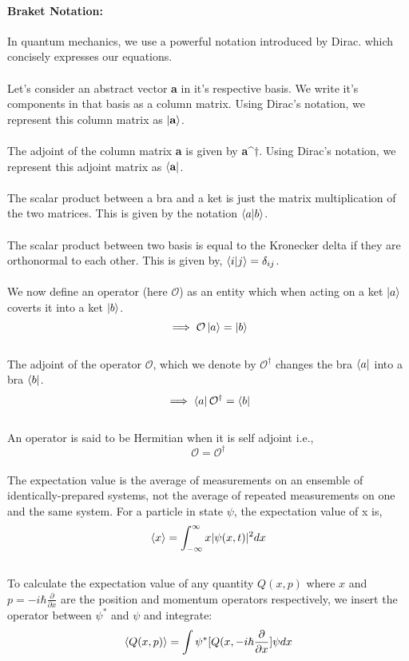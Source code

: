 \documentclass[12pt]{article}
\begin{document}
\paragraph{Braket Notation:}
In quantum mechanics, we use a powerful notation introduced by Dirac. which concisely expresses our equations. 
\\
\\
Let's consider an abstract vector \textbf{a} in it's respective basis. We write it's components in that basis as a 
column matrix. Using Dirac's notation, we represent this column matrix as $\ket{\textbf{a}}$.
\\
\\
The adjoint of the column matrix \textbf{a} is given by \textbf{a^$\dagger$}. Using Dirac's notation, we represent 
this adjoint matrix as $\bra{\textbf{a}}$.
\\
\\
The scalar product between a bra and a ket is just the matrix multiplication of the two matrices. This is given by the
 notation $\braket{a|b}$.
\\
\\
The scalar product between two basis is equal to the Kronecker delta if they are orthonormal to each other. 
This is given by, $\braket{i|j} = \delta_{ij}$.
\\
\\
We now define an operator (here $\mathcal{O}$) as an entity which when acting on a ket $\ket{a}$ coverts it into a ket $\ket{b}$. 
\[ \implies \mathcal{O} \ket{a} = \ket{b}\]
\\
The adjoint of the operator $\mathcal{O}$, which we denote by $\mathcal{O^\dagger}$ changes the bra $\bra{a}$ into a bra $\bra{b}$. 
\[ \implies \bra{a} \mathcal{O^\dagger} = \bra{b}\]
\\
An operator is said to be Hermitian when it is self adjoint i.e., 
\[ \mathcal{O} = \mathcal{O^\dagger}\]
\\
The expectation value is the average of measurements on an ensemble of identically-prepared systems, not the average 
of repeated measurements on one and the same system. For a particle in state $\psi$, the expectation value of x is,
\[ \braket{x} = \int_{-\infty}^{\infty} x |\psi(x,t)|^2 dx \]
\\
To calculate the expectation value of any quantity $Q(x,p)$ where $x$ and $p = -i \hbar \frac{\partial}{\partial x}$ are the
 position and momentum operators respectively, we insert the operator between $\psi^*$ and $\psi$ and integrate:
\[ \braket{Q(x,p)} = \int \psi^* [Q(x,-i\hbar\frac{\partial}{\partial x} ] \psi dx \]
\end{document}
